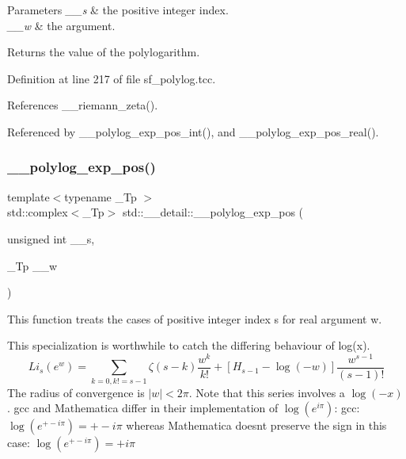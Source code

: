 \begin{DoxyParams}{Parameters}
{\em \+\_\+\+\_\+s} & the positive integer index. \\
\hline
{\em \+\_\+\+\_\+w} & the argument. \\
\hline
\end{DoxyParams}
\begin{DoxyReturn}{Returns}
the value of the polylogarithm. 
\end{DoxyReturn}


Definition at line 217 of file sf\+\_\+polylog.\+tcc.



References \+\_\+\+\_\+riemann\+\_\+zeta().



Referenced by \+\_\+\+\_\+polylog\+\_\+exp\+\_\+pos\+\_\+int(), and \+\_\+\+\_\+polylog\+\_\+exp\+\_\+pos\+\_\+real().

\mbox{\label{namespacestd_1_1____detail_ab13a4be6685dd222b654da3297342d7e}} 
\subsubsection{\texorpdfstring{\+\_\+\+\_\+polylog\+\_\+exp\+\_\+pos()}{\_\_polylog\_exp\_pos()}\hspace{0.1cm}{\footnotesize\ttfamily [2/3]}}
{\footnotesize\ttfamily template$<$typename \+\_\+\+Tp $>$ \\
std\+::complex$<$\+\_\+\+Tp$>$ std\+::\+\_\+\+\_\+detail\+::\+\_\+\+\_\+polylog\+\_\+exp\+\_\+pos (\begin{DoxyParamCaption}\item[{unsigned int}]{\+\_\+\+\_\+s,  }\item[{\+\_\+\+Tp}]{\+\_\+\+\_\+w }\end{DoxyParamCaption})}

This function treats the cases of positive integer index s for real argument w.

This specialization is worthwhile to catch the differing behaviour of log(x). \[ Li_s(e^w) = \sum_{k=0, k != s-1} \zeta(s-k) \frac{w^k}{k!} + \left[H_{s-1} - \log(-w)\right] \frac{w^{s-1}}{(s-1)!} \] The radius of convergence is $ |w| < 2 \pi $. Note that this series involves a $ \log(-x) $. gcc and Mathematica differ in their implementation of $ \log(e^{i\pi}) $\+: gcc\+: $ \log(e^{+-i\pi}) = +-i\pi $ whereas Mathematica doesn\textquotesingle{}t preserve the sign in this case\+: $ \log(e^{+- i\pi}) = +i\pi $



